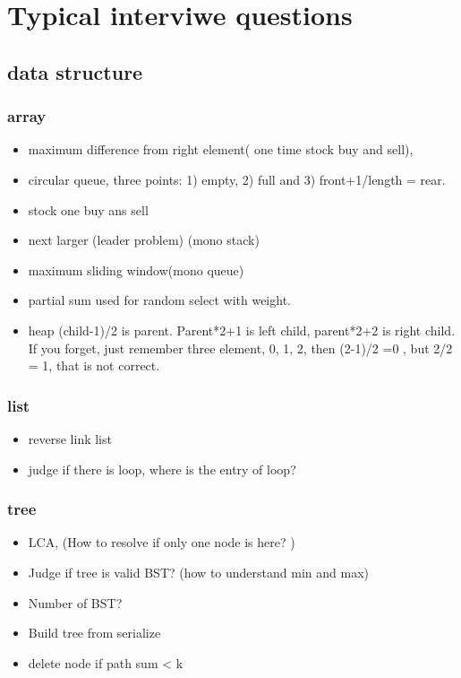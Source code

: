 \documentclass[a4paper,11pt,twoside]{book}
\begin{document}
\section{Typical interviwe questions}
\subsection{data structure}
\subsubsection{array}
\begin{itemize}
	
	\item maximum difference from right element( one time stock buy and sell), 
	
	\item circular queue, three points: 1) empty, 2) full and 3) front+1/length = rear. 
	
	
	\item stock one buy ans sell
	\item next larger (leader problem) (mono stack)
	\item maximum sliding window(mono queue)
	\item partial sum used for random select with weight. 
	
	\item heap (child-1)/2 is parent.  Parent*2+1 is left child, parent*2+2 is right child. If you forget, just remember three element, 0, 1, 2, then  (2-1)/2 =0 , but 2/2 = 1, that is not correct. 
	
	
\end{itemize}

\subsubsection{list}
\begin{itemize}
	\item reverse link list
	\item judge if there is loop, where is the entry of loop? 
\end{itemize}

\subsubsection{tree}
\begin{itemize}
	\item LCA, (How to resolve if only one node is here? )
	\item Judge if tree is valid BST? (how to understand min and max) 
	\item Number of BST?  
	\item Build tree from serialize
	\item delete node if path sum < k
\end{itemize}
\end{document}
